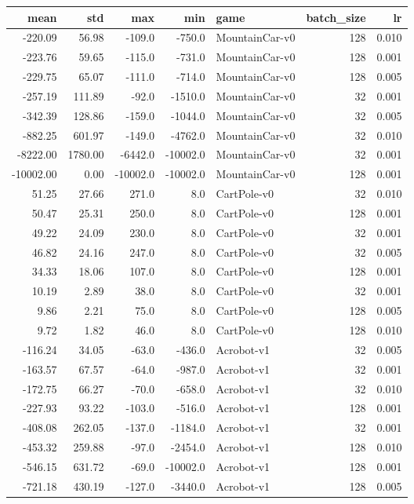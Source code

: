 \begin{tabular}{rrrrlrr}
\toprule
     mean &      std &      max &      min &            game &  batch\_size &     lr \\
\midrule
  -220.09 &    56.98 &   -109.0 &   -750.0 &  MountainCar-v0 &         128 &  0.010 \\
  -223.76 &    59.65 &   -115.0 &   -731.0 &  MountainCar-v0 &         128 &  0.001 \\
  -229.75 &    65.07 &   -111.0 &   -714.0 &  MountainCar-v0 &         128 &  0.005 \\
  -257.19 &   111.89 &    -92.0 &  -1510.0 &  MountainCar-v0 &          32 &  0.001 \\
  -342.39 &   128.86 &   -159.0 &  -1044.0 &  MountainCar-v0 &          32 &  0.005 \\
  -882.25 &   601.97 &   -149.0 &  -4762.0 &  MountainCar-v0 &          32 &  0.010 \\
 -8222.00 &  1780.00 &  -6442.0 & -10002.0 &  MountainCar-v0 &          32 &  0.001 \\
-10002.00 &     0.00 & -10002.0 & -10002.0 &  MountainCar-v0 &         128 &  0.001 \\
    51.25 &    27.66 &    271.0 &      8.0 &     CartPole-v0 &          32 &  0.010 \\
    50.47 &    25.31 &    250.0 &      8.0 &     CartPole-v0 &         128 &  0.001 \\
    49.22 &    24.09 &    230.0 &      8.0 &     CartPole-v0 &          32 &  0.001 \\
    46.82 &    24.16 &    247.0 &      8.0 &     CartPole-v0 &          32 &  0.005 \\
    34.33 &    18.06 &    107.0 &      8.0 &     CartPole-v0 &         128 &  0.001 \\
    10.19 &     2.89 &     38.0 &      8.0 &     CartPole-v0 &          32 &  0.001 \\
     9.86 &     2.21 &     75.0 &      8.0 &     CartPole-v0 &         128 &  0.005 \\
     9.72 &     1.82 &     46.0 &      8.0 &     CartPole-v0 &         128 &  0.010 \\
  -116.24 &    34.05 &    -63.0 &   -436.0 &      Acrobot-v1 &          32 &  0.005 \\
  -163.57 &    67.57 &    -64.0 &   -987.0 &      Acrobot-v1 &          32 &  0.001 \\
  -172.75 &    66.27 &    -70.0 &   -658.0 &      Acrobot-v1 &          32 &  0.010 \\
  -227.93 &    93.22 &   -103.0 &   -516.0 &      Acrobot-v1 &         128 &  0.001 \\
  -408.08 &   262.05 &   -137.0 &  -1184.0 &      Acrobot-v1 &          32 &  0.001 \\
  -453.32 &   259.88 &    -97.0 &  -2454.0 &      Acrobot-v1 &         128 &  0.010 \\
  -546.15 &   631.72 &    -69.0 & -10002.0 &      Acrobot-v1 &         128 &  0.001 \\
  -721.18 &   430.19 &   -127.0 &  -3440.0 &      Acrobot-v1 &         128 &  0.005 \\
\bottomrule
\end{tabular}
